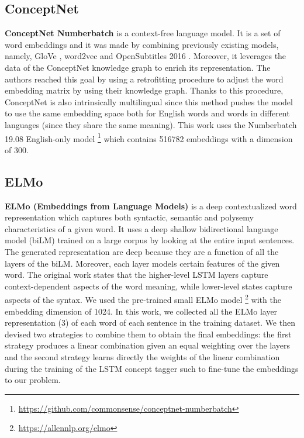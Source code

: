 \documentclass[11pt,a4paper]{article}
\begin{document}
\subsection{ConceptNet}
\textbf{ConceptNet Numberbatch} \cite{speer2017conceptnet} is a context-free language model. It is a set of word embeddings and it was made by combining previously existing models, namely, GloVe \cite{pennington2014glove}, word2vec \cite{mikolov2013efficient} and OpenSubtitles 2016 \cite{Lison2016OpenSubtitles2016EL}. Moreover, it leverages the data of the ConceptNet knowledge graph to enrich its representation. The authors reached this goal by using a retrofitting procedure to adjust the word embedding matrix by using their knowledge graph. Thanks to this procedure, ConceptNet is also intrinsically multilingual since this method pushes the model to use the same embedding space both for English words and words in different languages (since they share the same meaning).  This work uses the Numberbatch 19.08 English-only model \footnote{\url{https://github.com/commonsense/conceptnet-numberbatch}} which contains 516782 embeddings with a dimension of 300.

\subsection{ELMo}
\textbf{ELMo (Embeddings from Language Models)} \cite{Peters:2018} is a deep contextualized word representation which captures both syntactic, semantic and polysemy characteristics of a given word. It uses a deep shallow bidirectional language model (biLM) trained on a large corpus by looking at the entire input sentences. The generated representation are deep because they are a function of all the layers of the biLM. Moreover, each layer models certain features of the given word. The original work states that the higher-level LSTM layers capture context-dependent aspects of the word meaning, while lower-level states capture aspects of the syntax.
We used the pre-trained small ELMo model \footnote{\url{https://allennlp.org/elmo}} with the embedding dimension of 1024.
In this work, we collected all the ELMo layer representation (3) of each word of each sentence in the training dataset. We then devised two strategies to combine them to obtain the final embeddings: the first strategy produces a linear combination given an equal weighting over the layers and the second strategy learns directly the weights of the linear combination during the training of the LSTM concept tagger such to fine-tune the embeddings to our problem.
\end{document}
